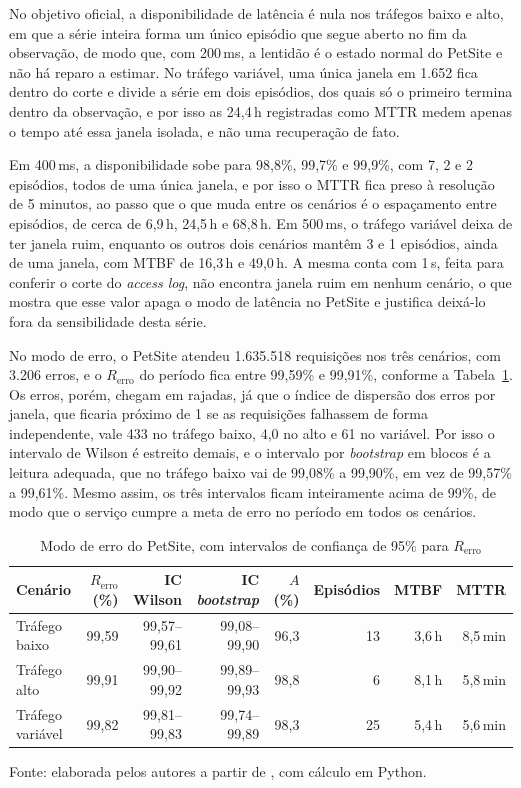 \documentclass[12pt, a4paper, oneside]{article}
\begin{document}
No objetivo oficial, a disponibilidade de latência é nula nos tráfegos baixo e alto, em que a série inteira forma um único episódio que segue aberto no fim da observação, de modo que, com 200\,ms, a lentidão é o estado normal do PetSite e não há reparo a estimar. No tráfego variável, uma única janela em 1.652 fica dentro do corte e divide a série em dois episódios, dos quais só o primeiro termina dentro da observação, e por isso as 24,4\,h registradas como MTTR medem apenas o tempo até essa janela isolada, e não uma recuperação de fato.

Em 400\,ms, a disponibilidade sobe para 98,8\%, 99,7\% e 99,9\%, com 7, 2 e 2 episódios, todos de uma única janela, e por isso o MTTR fica preso à resolução de 5 minutos, ao passo que o que muda entre os cenários é o espaçamento entre episódios, de cerca de 6,9\,h, 24,5\,h e 68,8\,h. Em 500\,ms, o tráfego variável deixa de ter janela ruim, enquanto os outros dois cenários mantêm 3 e 1 episódios, ainda de uma janela, com MTBF de 16,3\,h e 49,0\,h. A mesma conta com 1\,s, feita para conferir o corte do \textit{access log}, não encontra janela ruim em nenhum cenário, o que mostra que esse valor apaga o modo de latência no PetSite e justifica deixá-lo fora da sensibilidade desta série.

No modo de erro, o PetSite atendeu 1.635.518 requisições nos três cenários, com 3.206 erros, e o $R_{\mathrm{erro}}$ do período fica entre 99,59\% e 99,91\%, conforme a Tabela~\ref{tab:pet-erro}. Os erros, porém, chegam em rajadas, já que o índice de dispersão dos erros por janela, que ficaria próximo de 1 se as requisições falhassem de forma independente, vale 433 no tráfego baixo, 4,0 no alto e 61 no variável. Por isso o intervalo de Wilson é estreito demais, e o intervalo por \textit{bootstrap} em blocos é a leitura adequada, que no tráfego baixo vai de 99,08\% a 99,90\%, em vez de 99,57\% a 99,61\%. Mesmo assim, os três intervalos ficam inteiramente acima de 99\%, de modo que o serviço cumpre a meta de erro no período em todos os cenários.

\begin{table}[htbp]
\centering
\caption{Modo de erro do PetSite, com intervalos de confiança de 95\% para $R_{\mathrm{erro}}$}
\label{tab:pet-erro}
\small
\setlength{\tabcolsep}{4pt}
\begin{tabular}{lrrrrrrr}
\toprule
Cenário & $R_{\mathrm{erro}}$ (\%) & IC Wilson & IC \textit{bootstrap} & $A$ (\%) & Episódios & MTBF & MTTR \\
\midrule
Tráfego baixo & 99,59 & 99,57--99,61 & 99,08--99,90 & 96,3 & 13 & 3,6\,h & 8,5\,min \\
Tráfego alto & 99,91 & 99,90--99,92 & 99,89--99,93 & 98,8 & 6 & 8,1\,h & 5,8\,min \\
Tráfego variável & 99,82 & 99,81--99,83 & 99,74--99,89 & 98,3 & 25 & 5,4\,h & 5,6\,min \\
\bottomrule
\end{tabular}

\vspace{0.4em}

{\footnotesize Fonte: elaborada pelos autores a partir de , com cálculo em Python.}
\end{table}
\end{document}
